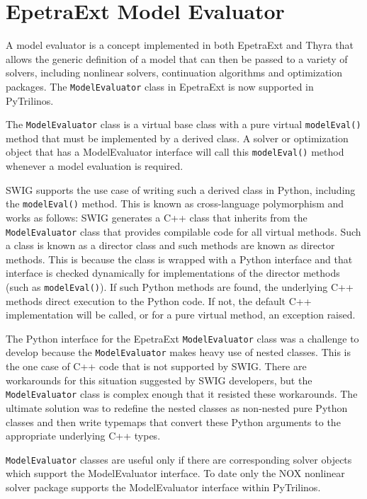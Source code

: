 \documentclass[11pt]{article}
\begin{document}
\section{EpetraExt Model Evaluator}
\label{sec:modelevaluator}

A model evaluator is a concept implemented in both EpetraExt and Thyra that allows the generic definition of a model that can then be passed to a variety of solvers, including nonlinear solvers, continuation algorithms and optimization packages.  The {\tt ModelEvaluator} class in EpetraExt is now supported in PyTrilinos.

The {\tt ModelEvaluator} class is a virtual base class with a pure virtual {\tt modelEval()} method that must be implemented by a derived class.  A solver or optimization object that has a ModelEvaluator interface will call this {\tt modelEval()} method whenever a model evaluation is required.

SWIG supports the use case of writing such a derived class in Python, including the {\tt modelEval()} method.  This is known as cross-language polymorphism and works as follows:  SWIG generates a C++ class that inherits from the {\tt ModelEvaluator} class that provides compilable code for all virtual methods.  Such a class is known as a director class and such methods are known as director methods.  This is because the class is wrapped with a Python interface and that interface is checked dynamically for implementations of the director methods (such as {\tt modelEval()}).  If such Python methods are found, the underlying C++ methods direct execution to the Python code.  If not, the default C++ implementation will be called, or for a pure virtual method, an exception raised.

The Python interface for the EpetraExt {\tt ModelEvaluator} class was a challenge to develop because the {\tt ModelEvaluator} makes heavy use of nested classes.  This is the one case of C++ code that is not supported by SWIG.  There are workarounds for this situation suggested by SWIG developers, but the {\tt ModelEvaluator} class is complex enough that it resisted these workarounds.  The ultimate solution was to redefine the nested classes as non-nested pure Python classes and then write typemaps that convert these Python arguments to the appropriate underlying C++ types.

{\tt ModelEvaluator} classes are useful only if there are corresponding solver objects which support the ModelEvaluator interface.  To date only the NOX nonlinear solver package supports the ModelEvaluator interface within PyTrilinos.
\end{document}
